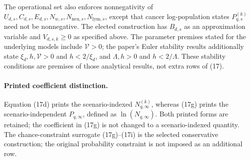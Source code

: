 \documentclass{article}
\begin{document}
The operational set also enforces nonnegativity of $U_{d,s},C_{d,s},E_{d,s},N_{w,s},N_{\mathrm{neu},s},N_{\mathrm{lym},s}$, except that cancer log-population states $P_{q,s}^{(k)}$ need not be nonnegative. The elected construction has $B_{d,s}$ as an approximation variable and $V_{d,s,k}\geq0$ as specified above. The parameter premises stated for the underlying models include $\mathcal V>0$; the paper's Euler stability results additionally state $\xi_d,h,\mathcal V>0$ and $h<2/\xi_d$, and $\Lambda,h>0$ and $h<2/\Lambda$. These stability conditions are premises of those analytical results, not extra rows of (17).

\paragraph{Printed coefficient distinction.}
Equation (17d) prints the scenario-indexed $N_{q,\infty}^{(k)}$, whereas (17g) prints the scenario-independent $P_{q,\infty}$, defined as $\ln(N_{q,\infty})$. Both printed forms are retained; the coefficient in (17g) is not changed to a scenario-indexed quantity. The chance-constraint surrogate (17g)--(17i) is the selected conservative construction; the original probability constraint is not imposed as an additional row.
\end{document}
